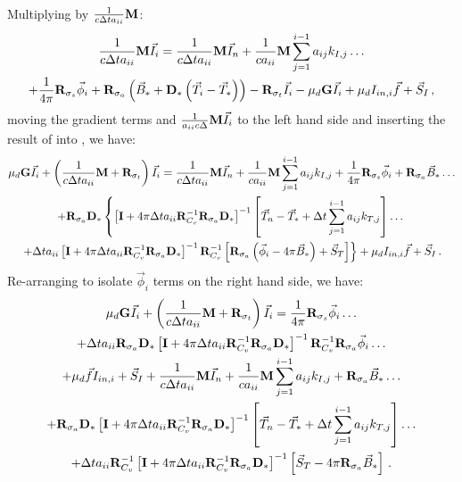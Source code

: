 %
Multiplying  by $\frac{1}{c\Delta t a_{ii}} \mathbf M$:
\begin{multline}
\frac{1}{c\Delta t a_{ii}} \mathbf M\vec{I}_i = \frac{1}{c\Delta t a_{ii}} \mathbf M\vec{I}_n + \frac{1}{c a_{ii}}  \mathbf M \sum_{j=1}^{i-1}{a_{ij} k_{I,j}   } \dots \\
+ 
\frac{1}{4\pi}\mathbf{R}_{\sigma_s}\vec{\phi}_i + 
\mathbf{R}_{\sigma_a}\left(\vec{B}_* +  \mathbf{D}_* \left(\vec{T}_i -\vec{T}_*  \right)   \right)- \mathbf{R}_{\sigma_t} \vec{I}_i - \mu_d\mathbf{G}\vec{I}_i + \mu_d I_{in,i} \vec{f}+ \vec{S}_I \, ,
\label{eq:kIi_second}
\end{multline}
%
%
moving the gradient terms and $\frac{1}{a_{ii} c \Delta }  \mathbf M \vec{I}_i$ to the left hand side and inserting the result of  into , we have:
%
%
\begin{multline}
\mu_d \mathbf{G} \vec{I}_i + \left( \frac{1}{c\Delta t a_{ii}} \mathbf M + \mathbf{R}_{\sigma_t} \right) \vec{I}_i = 
\frac{1}{c\Delta t a_{ii}} \mathbf M\vec{I}_n + \frac{1}{c a_{ii}}  \mathbf M \sum_{j=1}^{i-1}{a_{ij} k_{I,j}   } 
+ \frac{1}{4\pi}\mathbf{R}_{\sigma_s}\vec{\phi}_i 
+ \mathbf{R}_{\sigma_a}\vec{B}_* \dots \\ 
+ \mathbf{R}_{\sigma_a}  \mathbf{D}_*  \left \{
\left[ \mathbf{I}  + 4\pi \Delta t a_{ii}\mathbf{R}_{C_v}^{-1}\mathbf{R}_{\sigma_a} \mathbf{D}_*   \right]^{-1}
\left[\vec{T}_n -\vec{T}_* + \Delta t \sum_{j=1}^{i-1}{a_{ij} k_{T,j}   }\right]   \dots \right.  \\
\left.
+ \Delta t a_{ii}\left[ \mathbf{I} + 4\pi \Delta t a_{ii}\mathbf{R}_{C_v}^{-1} \mathbf{R}_{\sigma_a} \mathbf{D}_*   \right]^{-1} 
\mathbf{R}_{C_v}^{-1}\left[\mathbf{R}_{\sigma_a} \left(\vec{\phi}_i - 4\pi \vec{B}_*  \right) + \vec{S}_T \right]  \right \} + \mu_d I_{in,i} \vec{f} + \vec{S}_I \, .
\label{eq:intensity_stage_i_intermediate}
\end{multline}
%
%
Re-arranging  to isolate $\vec{\phi}_i$ terms on the right hand side, we have:
%
%
\begin{multline}
\mu_d \mathbf{G} \vec{I}_i + \left( \frac{1}{c\Delta t a_{ii}}\M + \R{\sigma_t} \right) \vec{I}_i =  \frac{1}{4\pi}\R{\sigma_s}\vec{\phi}_i \dots \\
%
%
+  \Delta t a_{ii} \R{\sigma_a} \D
\left[\I + 4\pi \Delta t a_{ii}\R{C_v}^{-1} \R{\sigma_a}\D  \right]^{-1}\R{C_v}^{-1}\R{\sigma_a}\vec{\phi}_i\dots \\
%
%
+ \mu_d \vec{f}I_{in,i} + \vec{S}_I +  \frac{1}{c\Delta t a_{ii}}\M\vec{I}_n + \frac{1}{c a_{ii}} \M \sum_{j=1}^{i-1}{a_{ij} k_{I,j}   } + \R{\sigma_a}\vec{B}_* \dots \\
%
%
+ \R{\sigma_a} \D
\left[\I+ 4\pi \Delta t a_{ii}\R{C_v}^{-1}\R{\sigma_a} \D\right]^{-1}
\left[ \vec{T}_n - \vec{T}_* + \Delta t \sum_{j=1}^{i-1}{a_{ij} k_{T,j}  }\right] \dots \\
  +\Delta t a_{ii}  \R{C_v}^{-1} \left[\I+ 4\pi \Delta t a_{ii}\R{C_v}^{-1}\R{\sigma_a} \D\right]^{-1} \left[\vec{S}_T - 4\pi\R{\sigma_a} \vec{B}_* \right] \pep
\end{multline}
